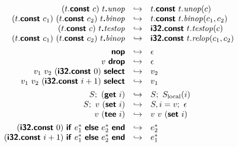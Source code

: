 \documentclass[a4paper]{scrartcl}
\newcommand\void[1]{}
\newcommand\x[1]{\ensuremath{\mathit{#1}}\xspace}
\newcommand\f[1]{\ensuremath{\mathop{\mathrm{#1\null}}\nolimits}\xspace}
\newcommand\evalto{\hookrightarrow}
\newcommand\K[1]{\ensuremath{\textsf{#1}}}
\newcommand\KK[1]{\ensuremath{\K{\textbf{#1}}}}
\begin{document}
\void{
$$
\frac{
  S;~e^\ast \evalto S';~{e'}^\ast
}{
  S;~E[e^\ast] \evalto S';~E[{e'}^\ast]
}
$$
}

$$
\begin{array}{rcl}
(t.\KK{const}~c)~t\KK{.}\x{unop} &\evalto&
  t.\KK{const}~t.\x{unop}(c) \\
(t.\KK{const}~c_1)~(t.\KK{const}~c_2)~t\KK{.}\x{binop} &\evalto&
  t.\KK{const}~t.\x{binop}(c_1, c_2) \\
(t.\KK{const}~c)~t\KK{.}\x{testop} &\evalto&
  \KK{i32.const}~t.\x{testop}(c) \\
(t.\KK{const}~c_1)~(t.\KK{const}~c_2)~t\KK{.}\x{binop} &\evalto&
  \KK{i32.const}~t.\x{relop}(c_1, c_2) \\
[1ex]
\KK{nop} &\evalto&
  \epsilon \\
v~\KK{drop} &\evalto&
  \epsilon \\
v_1~v_2~(\KK{i32.const}~0)~\KK{select} &\evalto&
  v_2 \\
v_1~v_2~(\KK{i32.const}~i+1)~\KK{select} &\evalto&
  v_1 \\
[1ex]
S;~ (\KK{get}~i) &\evalto&
  S;~ S_{\f{local}}(i) \\
S;~ v~(\KK{set}~i) &\evalto&
  S,i=v;~ \epsilon \\
v~(\KK{tee}~i) &\evalto&
  v~v~(\KK{set}~i) \\
[1ex]
\void{
\KK{block}~v^\ast~\KK{end} &\evalto&
  v^\ast \\
\KK{block}~v^\ast~v^n~(\KK{br}_n~0)~e^\ast~\KK{end} &\evalto&
  v^n \\
\KK{block}~v^\ast~v^n~(\KK{br}_n~i+1)~e^\ast~\KK{end} &\evalto&
 v^n~(\KK{br}_n~i) \\
[1ex]
\KK{loop}~e^\ast~\KK{end} &\evalto&
  \KK{block}~e^\ast~\KK{end}~\KK{loop}~e^\ast~\KK{end} \\
[1ex]
}
(\KK{i32.const}~0)~\KK{if}~e_1^\ast~\KK{else}~e_2^\ast~\KK{end} &\evalto&
  e_2^\ast \\
(\KK{i32.const}~i+1)~\KK{if}~e_1^\ast~\KK{else}~e_2^\ast~\KK{end} &\evalto&
  e_1^\ast \\
\end{array}
$$
\vspace{2em}
\end{document}
